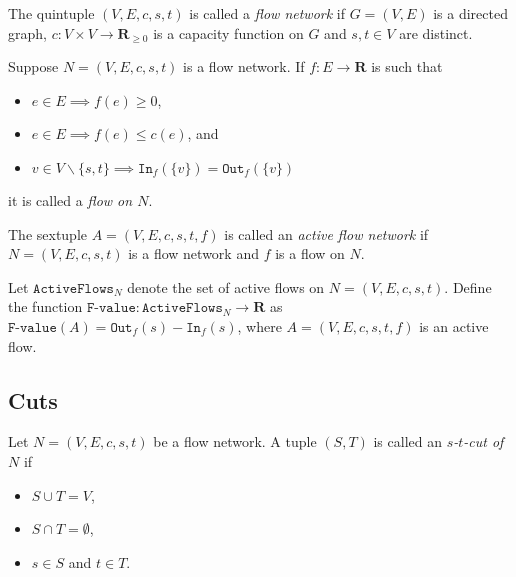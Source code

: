 \documentclass{article}
\begin{document}
\begin{definition}
    The quintuple $(V, E, c, s, t)$ is called a \textit{flow network} if $G=(V, E)$ is a directed graph, $c: V \times V \to \mathbf{R}_{\geq 0}$ is a capacity function on $G$ and $s, t \in V$ are distinct.
\end{definition}

\begin{definition}
    Suppose $N=(V, E, c, s, t)$ is a flow network. If $f: E \to \mathbf{R}$ is such that
    \begin{itemize}
        \item $e \in E \implies f(e) \geq 0$,
        \item $e \in E \implies f(e) \leq c(e)$, and
        \item $v \in V \backslash \{s, t\} \implies \texttt{In}_f(\{v\}) = \texttt{Out}_f(\{v\})$
    \end{itemize}
    it is called a \textit{flow on $N$}.
\end{definition}

\begin{definition}
    The sextuple $A=(V, E, c, s, t, f)$ is called an \textit{active flow network} if $N=(V, E, c, s, t)$ is a flow network and $f$ is a flow on $N$.
\end{definition}

\begin{definition}
    Let $\texttt{ActiveFlows}_N$ denote the set of active flows on $N=(V, E, c, s, t)$. Define the function $\texttt{F-value}: \texttt{ActiveFlows}_N \to \mathbf{R}$ as $\texttt{F-value}(A)=\texttt{Out}_f(s) - \texttt{In}_f(s)$, where $A=(V, E, c, s, t, f)$ is an active flow.
\end{definition}


\subsection{Cuts}
\begin{definition}
    Let $N=(V, E, c, s, t)$ be a flow network. A tuple $(S, T)$ is called an \textit{$s$-$t$-cut of $N$} if
    \begin{itemize}
        \item $S \cup T = V$,
        \item $S \cap T = \emptyset$,
        \item $s \in S$ and $t \in T$.
    \end{itemize}
\end{definition}
\end{document}
